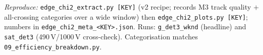 \documentclass[11pt]{article}
\begin{document}
\vspace{0.4em}
\footnotesize\noindent\textit{Reproduce:} \texttt{edge\_chi2\_extract.py [KEY]} (v2 recipe;
records M3 track quality $+$ all-crossing categories over a wide window) then
\texttt{edge\_chi2\_plots.py [KEY]}; numbers in \texttt{edge\_chi2\_meta\_<KEY>.json}. Runs:
\texttt{g\_det3\_wknd} (headline) and \texttt{sat\_det3} (490\,V/1000\,V cross-check).
Categorisation matches \texttt{09\_efficiency\_breakdown.py}.
\end{document}
